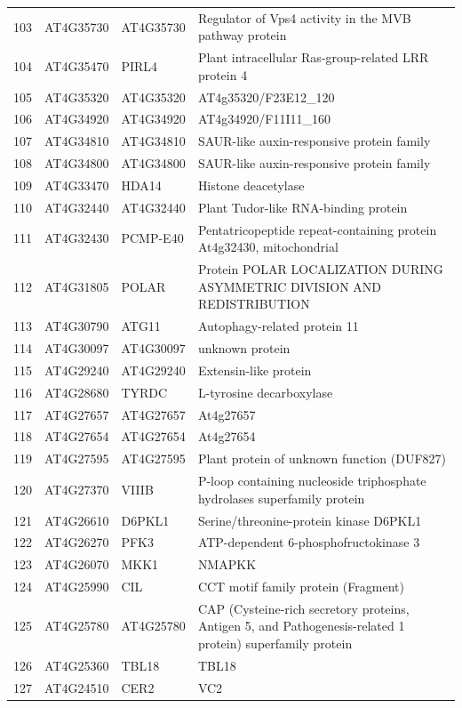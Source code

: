 \documentclass[11pt]{article}
\begin{document}
\begin{center}
\begin{tabular}{rlll}
103 & AT4G35730 & AT4G35730 & Regulator of Vps4 activity in the MVB pathway protein\\
104 & AT4G35470 & PIRL4 & Plant intracellular Ras-group-related LRR protein 4\\
105 & AT4G35320 & AT4G35320 & AT4g35320/F23E12\_120\\
106 & AT4G34920 & AT4G34920 & AT4g34920/F11I11\_160\\
107 & AT4G34810 & AT4G34810 & SAUR-like auxin-responsive protein family\\
108 & AT4G34800 & AT4G34800 & SAUR-like auxin-responsive protein family\\
109 & AT4G33470 & HDA14 & Histone deacetylase\\
110 & AT4G32440 & AT4G32440 & Plant Tudor-like RNA-binding protein\\
111 & AT4G32430 & PCMP-E40 & Pentatricopeptide repeat-containing protein At4g32430, mitochondrial\\
112 & AT4G31805 & POLAR & Protein POLAR LOCALIZATION DURING ASYMMETRIC DIVISION AND REDISTRIBUTION\\
113 & AT4G30790 & ATG11 & Autophagy-related protein 11\\
114 & AT4G30097 & AT4G30097 & unknown protein\\
115 & AT4G29240 & AT4G29240 & Extensin-like protein\\
116 & AT4G28680 & TYRDC & L-tyrosine decarboxylase\\
117 & AT4G27657 & AT4G27657 & At4g27657\\
118 & AT4G27654 & AT4G27654 & At4g27654\\
119 & AT4G27595 & AT4G27595 & Plant protein of unknown function (DUF827)\\
120 & AT4G27370 & VIIIB & P-loop containing nucleoside triphosphate hydrolases superfamily protein\\
121 & AT4G26610 & D6PKL1 & Serine/threonine-protein kinase D6PKL1\\
122 & AT4G26270 & PFK3 & ATP-dependent 6-phosphofructokinase 3\\
123 & AT4G26070 & MKK1 & NMAPKK\\
124 & AT4G25990 & CIL & CCT motif family protein (Fragment)\\
125 & AT4G25780 & AT4G25780 & CAP (Cysteine-rich secretory proteins, Antigen 5, and Pathogenesis-related 1 protein) superfamily protein\\
126 & AT4G25360 & TBL18 & TBL18\\
127 & AT4G24510 & CER2 & VC2\\

\end{tabular}
\end{center}
\end{document}

